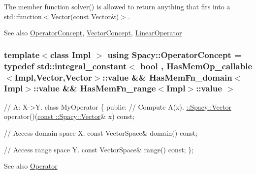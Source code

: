 The member function {\ttfamily solver()} is allowed to return anything that fits into a {\ttfamily std\+::function$<$Vector(const Vector\&)$>$}.

\begin{DoxySeeAlso}{See also}
\hyperlink{group__ConceptGroup_ga0cd6ba53feff75abbb6822b45fd6265e}{Operator\+Concept}, \hyperlink{group__ConceptGroup_gac8fbeed0f838941e90ebe635a546e1db}{Vector\+Concept}, \hyperlink{classSpacy_1_1LinearOperator}{Linear\+Operator} 
\end{DoxySeeAlso}
\hypertarget{group__ConceptGroup_ga0cd6ba53feff75abbb6822b45fd6265e}{}
\subsubsection[{Operator\+Concept}]{\setlength{\rightskip}{0pt plus 5cm}template$<$class Impl $>$ using {\bf Spacy\+::\+Operator\+Concept} = typedef std\+::integral\+\_\+constant$<$ bool , Has\+Mem\+Op\+\_\+callable$<$Impl,Vector,Vector$>$\+::value \&\& Has\+Mem\+Fn\+\_\+domain$<$Impl$>$\+::value \&\& Has\+Mem\+Fn\+\_\+range$<$Impl$>$\+::value $>$}\label{group__ConceptGroup_ga0cd6ba53feff75abbb6822b45fd6265e}
\label{group__ConceptGroup_OperatorConceptAnchor}%
\hypertarget{group__ConceptGroup_OperatorConceptAnchor}{}%
 
\begin{DoxyCode}
\textcolor{comment}{// A: X->Y.}
\textcolor{keyword}{class }MyOperator
\{
\textcolor{keyword}{public}:
  \textcolor{comment}{// Compute A(x).}
  \hyperlink{classSpacy_1_1Vector}{::Spacy::Vector} operator()(\hyperlink{group__VectorSpaceGroup_gafda42fd5aa3f7597a42b9831bf4dfd07}{const ::Spacy::Vector}& x) \textcolor{keyword}{const};

  \textcolor{comment}{// Access domain space X.}
  \textcolor{keyword}{const} VectorSpace& domain() \textcolor{keyword}{const};

  \textcolor{comment}{// Access range space Y.}
  \textcolor{keyword}{const} VectorSpace& range() \textcolor{keyword}{const};
\};
\end{DoxyCode}
 \begin{DoxySeeAlso}{See also}
\hyperlink{classSpacy_1_1Operator}{Operator} 
\end{DoxySeeAlso}
\hypertarget{group__ConceptGroup_gac8fbeed0f838941e90ebe635a546e1db}{}
